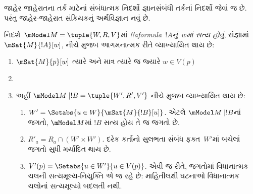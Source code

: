 \documentclass[../../../include/open-logic-section]{subfiles}
\begin{document}


જાહેર જાહેરાતના તર્ક માટેનાં સંબંધાત્મક નિદર્શો જ્ઞાનસંબંધી
તર્કનાં નિદર્શો જેવાં જ છે. પરંતુ જાહેર-જાહેરાત સંક્રિયકનું
અર્થવિજ્ઞાન નવું છે.

\begin{defn} નિદર્શ~$\mModel M = \tuple{W, R, V}$માં
  \emph{!!a{formula}~$!A$નું~$w$માં સત્ય હોવું}, સંજ્ઞામાં
  $\mSat{M}{!A}[w]$, નીચે મુજબ આગમનાત્મક રીતે વ્યાખ્યાયિત થાય છે:
  \begin{enumerate}
  \item $\mSat{M}{p}[w]$ ત્યારે અને માત્ર ત્યારે જ જ્યારે $w \in V(p)$
  \item{}
  \item{}

  
  અહીં $\mModel M \mid !B = \tuple{W', R', V'}$ નીચે મુજબ
  વ્યાખ્યાયિત થાય છે:
  \begin{enumerate}
    \item $W' = \Setabs{ u \in W}{\mSat{M}{!B}[u]}$. એટલે
      $\mModel M \mid !B$નાં જગતો, $\mModel M$માં $!B$ સત્ય હોય
      તે જ જગતો છે.
    \item $R'_a = R_a \cap (W' \times W')$. દરેક કર્તાનો સુલભતા
      સંબંધ ફક્ત~$W'$માં બચેલાં જગતો સુધી મર્યાદિત થાય છે.
    \item $V'(p) = \Setabs{ u \in W'}{u \in V(p) }$. એવી જ રીતે,
      જગતોમાં વિધાનાત્મક ચલની સત્યમૂલ્ય-નિયુક્તિ એ જ રહે છે: માહિતીલક્ષી
      ઘટનાઓ વિધાનાત્મક ચલોનાં સત્યમૂલ્યો બદલતી નથી.
  \end{enumerate}
  
  \end{enumerate} 
\end{defn}
\end{document}
